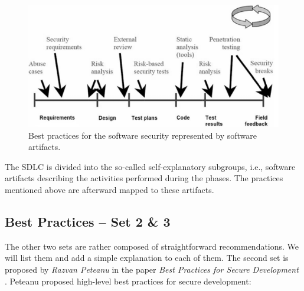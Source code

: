 \documentclass[12pt,a4,twoside]{article}
\begin{document}
\begin{figure}[h]
\centering
\includegraphics[width=.8\textwidth]{figures/best_practices.png}
\caption{Best practices for the software security represented by software artifacts. \cite{davis_secure_software}}
\label{fig:best_practices}
\end{figure}

The SDLC is divided into the so-called self-explanatory subgroups, i.e., software artifacts describing the activities performed during the phases. The practices mentioned above are afterward mapped to these artifacts.

\subsection{Best Practices -- Set 2 \& 3}

The other two sets are rather composed of straightforward recommendations. We will list them and add a simple explanation to each of them. The second set is proposed by \textit{Razvan Peteanu} in the paper \textit{Best Practices for Secure Development} \cite{razvan_best_practices}. Peteanu proposed high-level best practices for secure development:
\end{document}
